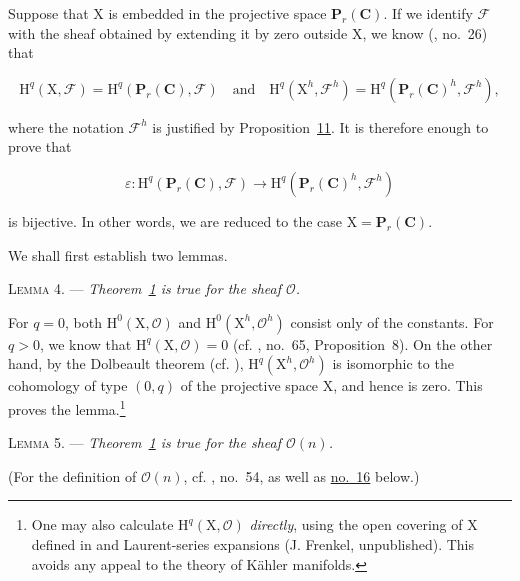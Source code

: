 
Suppose that $\mathrm{X}$ is embedded in the projective space $\mathbf{P}_r(\mathbf{C})$. If we identify $\mathcal{F}$ with the sheaf obtained by extending it by zero outside $\mathrm{X}$, we know (, no.~26) that

\begin{equation*}
\mathrm{H}^q(\mathrm{X},\mathcal{F})=\mathrm{H}^q(\mathbf{P}_r(\mathbf{C}),\mathcal{F})
\quad\text{and}\quad
\mathrm{H}^q(\mathrm{X}^h,\mathcal{F}^h)=
\mathrm{H}^q(\mathbf{P}_r(\mathbf{C})^h,\mathcal{F}^h),
\end{equation*}

where the notation $\mathcal{F}^h$ is justified by Proposition~\hyperref[gaga:prop:11]{11}. It is therefore enough to prove that

\begin{equation*}
\varepsilon:\mathrm{H}^q(\mathbf{P}_r(\mathbf{C}),\mathcal{F})
\longrightarrow
\mathrm{H}^q(\mathbf{P}_r(\mathbf{C})^h,\mathcal{F}^h)
\end{equation*}

is bijective. In other words, we are reduced to the case $\mathrm{X}=\mathbf{P}_r(\mathbf{C})$.

We shall first establish two lemmas.

\textsc{Lemma 4}. --- \emph{Theorem~\hyperref[gaga:thm:1]{1} is true for the sheaf $\mathcal{O}$.}

For $q=0$, both $\mathrm{H}^0(\mathrm{X},\mathcal{O})$ and $\mathrm{H}^0(\mathrm{X}^h,\mathcal{O}^h)$ consist only of the constants. For $q>0$, we know that $\mathrm{H}^q(\mathrm{X},\mathcal{O})=0$ (cf. , no.~65, Proposition~8). On the other hand, by the Dolbeault theorem (cf. ), $\mathrm{H}^q(\mathrm{X}^h,\mathcal{O}^h)$ is isomorphic to the cohomology of type $(0,q)$ of the projective space $\mathrm{X}$, and hence is zero. This proves the lemma.\footnote{One may also calculate $\mathrm{H}^q(\mathrm{X},\mathcal{O})$ \emph{directly}, using the open covering of $\mathrm{X}$ defined in  and Laurent-series expansions (J. Frenkel, unpublished). This avoids any appeal to the theory of Kähler manifolds.}

\textsc{Lemma 5}. --- \emph{Theorem~\hyperref[gaga:thm:1]{1} is true for the sheaf $\mathcal{O}(n)$.}

(For the definition of $\mathcal{O}(n)$, cf. , no.~54, as well as \hyperref[gaga:no:16]{no.~16} below.)

